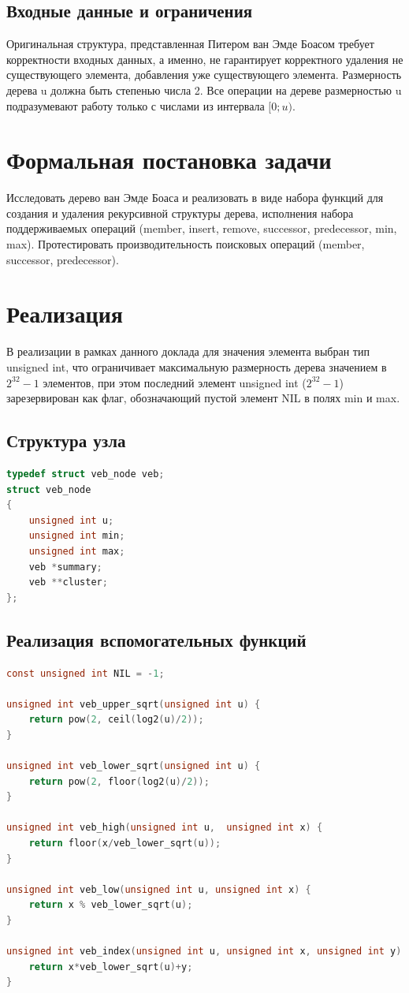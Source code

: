 \documentclass{article}
\begin{document}
\subsection{Входные данные и ограничения}

Оригинальная структура, представленная Питером ван Эмде Боасом требует корректности входных данных, а именно, не гарантирует корректного удаления не существующего элемента, добавления уже существующего элемента. Размерность дерева u должна быть степенью числа 2. Все операции на дереве размерностью u подразумевают работу только с числами из интервала $[0;u)$. \cite{ita}
\section{Формальная постановка задачи}

Исследовать дерево ван Эмде Боаса и реализовать в виде набора функций для создания и удаления рекурсивной структуры дерева, исполнения набора поддерживаемых операций (member, insert, remove, successor, predecessor, min, max). Протестировать производительность поисковых операций (member, successor, predecessor).
\section{Реализация}

В реализации в рамках данного доклада для значения элемента выбран тип unsigned int, что ограничивает максимальную размерность дерева значением в $2^{32}-1$ элементов, при этом последний элемент unsigned int ($2^{32}-1$) зарезервирован как флаг, обозначающий пустой элемент NIL в полях min и max.
\subsection{Структура узла}
\begin{lstlisting}[language=C,style=C]
typedef struct veb_node veb;
struct veb_node
{
    unsigned int u;
    unsigned int min;
    unsigned int max;
    veb *summary;
    veb **cluster;
};
\end{lstlisting}
\subsection{Реализация вспомогательных функций}
\begin{lstlisting}[language=C,style=C]
const unsigned int NIL = -1;

unsigned int veb_upper_sqrt(unsigned int u) {
    return pow(2, ceil(log2(u)/2));
}

unsigned int veb_lower_sqrt(unsigned int u) {
    return pow(2, floor(log2(u)/2));
}

unsigned int veb_high(unsigned int u,  unsigned int x) {
    return floor(x/veb_lower_sqrt(u));
}

unsigned int veb_low(unsigned int u, unsigned int x) {
    return x % veb_lower_sqrt(u);
}

unsigned int veb_index(unsigned int u, unsigned int x, unsigned int y) {
    return x*veb_lower_sqrt(u)+y;
}
\end{lstlisting}
\end{document}
